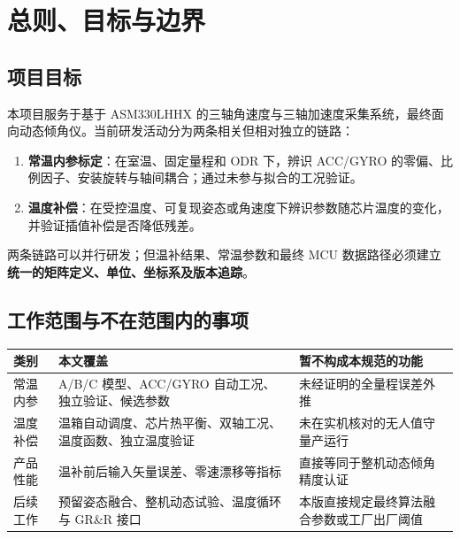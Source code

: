 \chapter{总则、目标与边界}
\section{项目目标}
本项目服务于基于 ASM330LHHX 的三轴角速度与三轴加速度采集系统，最终面向动态倾角仪。当前研发活动分为两条相关但相对独立的链路：
\begin{enumerate}
\item \textbf{常温内参标定}：在室温、固定量程和 ODR 下，辨识 ACC/GYRO 的零偏、比例因子、安装旋转与轴间耦合；通过未参与拟合的工况验证。
\item \textbf{温度补偿}：在受控温度、可复现姿态或角速度下辨识参数随芯片温度的变化，并验证插值补偿是否降低残差。
\end{enumerate}
两条链路可以并行研发；但温补结果、常温参数和最终 MCU 数据路径必须建立\textbf{统一的矩阵定义、单位、坐标系及版本追踪}。

\section{工作范围与不在范围内的事项}
\noindent\begin{tabularx}{\linewidth}{@{}p{38mm}YY@{}}\toprule
类别 & 本文覆盖 & 暂不构成本规范的功能\\\midrule
常温内参 & A/B/C 模型、ACC/GYRO 自动工况、独立验证、候选参数 & 未经证明的全量程误差外推\\
温度补偿 & 温箱自动调度、芯片热平衡、双轴工况、温度函数、独立温度验证 & 未在实机核对的无人值守量产运行\\
产品性能 & 温补前后输入矢量误差、零速漂移等指标 & 直接等同于整机动态倾角精度认证\\
后续工作 & 预留姿态融合、整机动态试验、温度循环与 GR\&R 接口 & 本版直接规定最终算法融合参数或工厂出厂阈值\\\bottomrule\end{tabularx}
